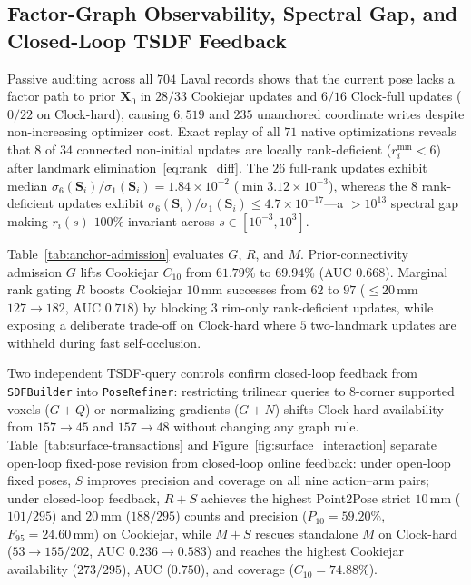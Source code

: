 \documentclass{evidencescene}
\begin{document}
\subsection{Factor-Graph Observability, Spectral Gap, and Closed-Loop TSDF Feedback}
Passive auditing across all $704$ Laval records shows that the current pose lacks a factor path to prior $\mathbf{X}_0$ in $28/33$ Cookiejar updates and $6/16$ Clock-full updates ($0/22$ on Clock-hard), causing $6{,}519$ and $235$ unanchored coordinate writes despite non-increasing optimizer cost. Exact replay of all $71$ native optimizations reveals that $8$ of $34$ connected non-initial updates are locally rank-deficient ($r_i^{\min}<6$) after landmark elimination~\eqref{eq:rank_diff}. The $26$ full-rank updates exhibit median $\sigma_6(\mathbf{S}_i)/\sigma_1(\mathbf{S}_i)=1.84\times 10^{-2}$ ($\min 3.12\times 10^{-3}$), whereas the $8$ rank-deficient updates exhibit $\sigma_6(\mathbf{S}_i)/\sigma_1(\mathbf{S}_i)\le 4.7\times 10^{-17}$---a $>10^{13}$ spectral gap making $r_i(s)$ $100\%$ invariant across $s\in[10^{-3},10^3]$.

Table~\ref{tab:anchor-admission} evaluates $G$, $R$, and $M$. Prior-connectivity admission $G$ lifts Cookiejar $C_{10}$ from $61.79\%$ to $69.94\%$ (AUC $0.668$). Marginal rank gating $R$ boosts Cookiejar $10\,\mathrm{mm}$ successes from $62$ to $97$ ($\le 20\,\mathrm{mm}$ $127\to 182$, AUC $0.718$) by blocking $3$ rim-only rank-deficient updates, while exposing a deliberate trade-off on Clock-hard where $5$ two-landmark updates are withheld during fast self-occlusion.



Two independent TSDF-query controls confirm closed-loop feedback from \texttt{SDFBuilder} into \texttt{PoseRefiner}: restricting trilinear queries to 8-corner supported voxels ($G+Q$) or normalizing gradients ($G+N$) shifts Clock-hard availability from $157\to 45$ and $157\to 48$ without changing any graph rule. Table~\ref{tab:surface-transactions} and Figure~\ref{fig:surface_interaction} separate open-loop fixed-pose revision from closed-loop online feedback: under open-loop fixed poses, $S$ improves precision and coverage on all nine action--arm pairs; under closed-loop feedback, $R+S$ achieves the highest Point2Pose strict $10\,\mathrm{mm}$ ($101/295$) and $20\,\mathrm{mm}$ ($188/295$) counts and precision ($P_{10}=59.20\%$, $F_{95}=24.60\,\mathrm{mm}$) on Cookiejar, while $M+S$ rescues standalone $M$ on Clock-hard ($53\to 155/202$, AUC $0.236\to 0.583$) and reaches the highest Cookiejar availability ($273/295$), AUC ($0.750$), and coverage ($C_{10}=74.88\%$).
\end{document}
